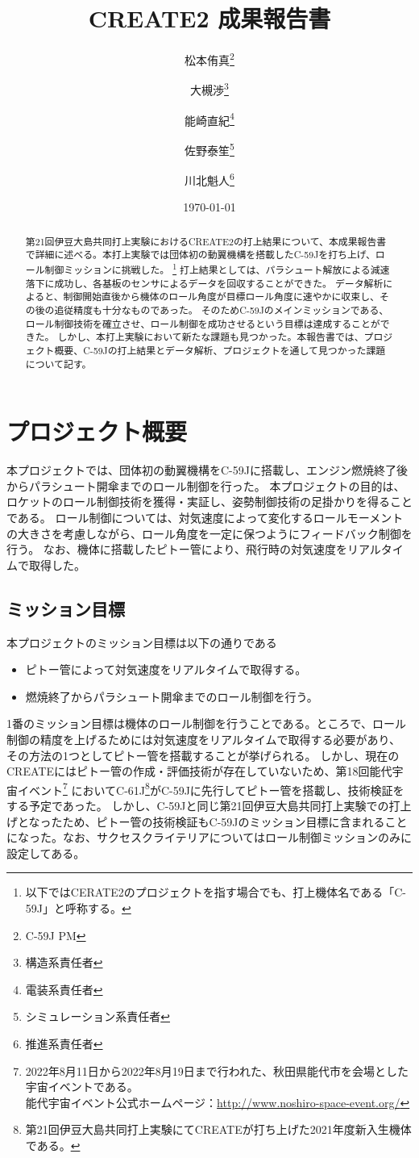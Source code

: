 \documentclass[a4paper,11pt,uplatex]{jsarticle}
\title{CREATE2 成果報告書}
\date{\today}
\author{松本侑真\thanks{C-59J PM}\and{大槻渉}\thanks{構造系責任者}
\and{能崎直紀}\thanks{電装系責任者}\and{佐野泰笙}\thanks{シミュレーション系責任者}
\and{川北魁人}\thanks{推進系責任者}}
\begin{document}
\maketitle


\begin{abstract}
	第21回伊豆大島共同打上実験におけるCREATE2の打上結果について、本成果報告書で詳細に述べる。本打上実験では団体初の動翼機構を搭載したC-59Jを打ち上げ、ロール制御ミッションに挑戦した。
	\footnote{以下ではCERATE2のプロジェクトを指す場合でも、打上機体名である「C-59J」と呼称する。}
	打上結果としては、パラシュート解放による減速落下に成功し、各基板のセンサによるデータを回収することができた。
	データ解析によると、制御開始直後から機体のロール角度が目標ロール角度に速やかに収束し、その後の追従精度も十分なものであった。
	そのためC-59Jのメインミッションである、ロール制御技術を確立させ、ロール制御を成功させるという目標は達成することができた。
	しかし、本打上実験において新たな課題も見つかった。本報告書では、プロジェクト概要、C-59Jの打上結果とデータ解析、プロジェクトを通して見つかった課題について記す。
\end{abstract}
\newpage
\tableofcontents
\newpage

\section{プロジェクト概要}
本プロジェクトでは、団体初の動翼機構をC-59Jに搭載し、エンジン燃焼終了後からパラシュート開傘までのロール制御を行った。
本プロジェクトの目的は、ロケットのロール制御技術を獲得・実証し、姿勢制御技術の足掛かりを得ることである。
ロール制御については、対気速度によって変化するロールモーメントの大きさを考慮しながら、ロール角度を一定に保つようにフィードバック制御を行う。
なお、機体に搭載したピトー管により、飛行時の対気速度をリアルタイムで取得した。

\subsection{ミッション目標}
本プロジェクトのミッション目標は以下の通りである
\begin{itemize}
	\item ピトー管によって対気速度をリアルタイムで取得する。
	\item 燃焼終了からパラシュート開傘までのロール制御を行う。
\end{itemize}

1番のミッション目標は機体のロール制御を行うことである。ところで、ロール制御の精度を上げるためには対気速度をリアルタイムで取得する必要があり、
その方法の1つとしてピトー管を搭載することが挙げられる。
しかし、現在のCREATEにはピトー管の作成・評価技術が存在していないため、第18回能代宇宙イベント\footnote{2022年8月11日から2022年8月19日まで行われた、秋田県能代市を会場とした宇宙イベントである。\\
	能代宇宙イベント公式ホームページ：\url{http://www.noshiro-space-event.org/}}
においてC-61J\footnote{第21回伊豆大島共同打上実験にてCREATEが打ち上げた2021年度新入生機体である。}がC-59Jに先行してピトー管を搭載し、技術検証をする予定であった。
しかし、C-59Jと同じ第21回伊豆大島共同打上実験での打上げとなったため、ピトー管の技術検証もC-59Jのミッション目標に含まれることになった。なお、サクセスクライテリアについてはロール制御ミッションのみに設定してある。
\end{document}
